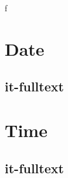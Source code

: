 \documentclass[italian]{article}
\begin{document}
 

\thispagestyle{empty}
 f
	\section{Date}
	\subsection{it-fulltext}
	
	\section{Time}
	\subsection{it-fulltext}
	
\end{document}
